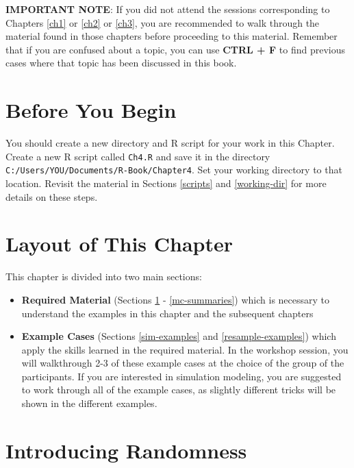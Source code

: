 \documentclass[]{book}
\theoremstyle{definition}
\theoremstyle{definition}
\theoremstyle{definition}
\theoremstyle{remark}
\begin{document}
\textbf{IMPORTANT NOTE}: If you did not attend the sessions
corresponding to Chapters \ref{ch1} or \ref{ch2} or \ref{ch3}, you are
recommended to walk through the material found in those chapters before
proceeding to this material. Remember that if you are confused about a
topic, you can use \textbf{CTRL + F} to find previous cases where that
topic has been discussed in this book.

\section*{Before You Begin}\label{before-you-begin-3}

You should create a new directory and R script for your work in this
Chapter. Create a new R script called \texttt{Ch4.R} and save it in the
directory \texttt{C:/Users/YOU/Documents/R-Book/Chapter4}. Set your
working directory to that location. Revisit the material in Sections
\ref{scripts} and \ref{working-dir} for more details on these steps.

\section*{Layout of This Chapter}\label{layout-of-this-chapter}

This chapter is divided into two main sections:

\begin{itemize}
\item
  \textbf{Required Material} (Sections \ref{randomness} -
  \ref{mc-summaries}) which is necessary to understand the examples in
  this chapter and the subsequent chapters
\item
  \textbf{Example Cases} (Sections \ref{sim-examples} and
  \ref{resample-examples}) which apply the skills learned in the
  required material. In the workshop session, you will walkthrough 2-3
  of these example cases at the choice of the group of the participants.
  If you are interested in simulation modeling, you are suggested to
  work through all of the example cases, as slightly different tricks
  will be shown in the different examples.
\end{itemize}

\section{Introducing Randomness}\label{randomness}
\end{document}
